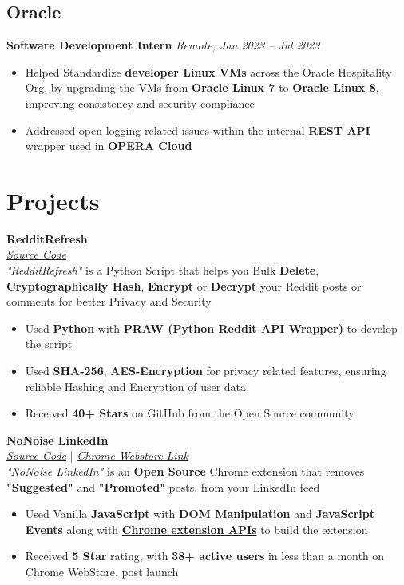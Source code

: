 \documentclass[a4paper,8pt]{article}
\newcommand{\praw}{\href{https://github.com/praw-dev/praw}{PRAW (Python Reddit API Wrapper)}}
\begin{document}
\subsection*{Oracle }
\textbf{Software Development Intern} \hfill \textit{Remote, Jan 2023 -- Jul 2023}
\begin{itemize}[leftmargin=1.5em]
  \item Helped Standardize \textbf{developer Linux VMs} across the Oracle Hospitality Org, by upgrading the VMs from \textbf{Oracle Linux 7} to \textbf{Oracle Linux 8}, improving consistency and security compliance 
  \item Addressed open logging-related issues within the internal \textbf{REST API} wrapper used in \textbf{OPERA Cloud}
\end{itemize}

\section*{\faRocket\hspace{0.5em}Projects}

\textbf{RedditRefresh} \\ \textit{\href{https://github.com/karan51ngh/RedditRefresh}{Source Code}} \\
\textit{"RedditRefresh"} is a Python Script that helps you Bulk \textbf{Delete}, \textbf{Cryptographically Hash}, \textbf{Encrypt} or \textbf{Decrypt} your Reddit posts or comments for better Privacy and Security
\begin{itemize}[leftmargin=1.5em]
    \item Used \textbf{Python} with \textbf{\praw} to develop the script
    \item Used \textbf{SHA-256}, \textbf{AES-Encryption} for privacy related features, ensuring reliable Hashing and Encryption of user data
    \item Received \textbf{40+ Stars} on GitHub from the Open Source community
\end{itemize}
\textbf{NoNoise LinkedIn} \\ \textit{\href{https://github.com/karan51ngh/no-noise-linkedin}{Source Code}} | \textit{\href{https://github.com/karan51ngh/no-noise-linkedin}{Chrome Webstore Link}} \\
\textit{"NoNoise LinkedIn"} is an \textbf{Open Source} Chrome extension that removes \textbf{"Suggested"} and \textbf{"Promoted"} posts, from your LinkedIn feed

\begin{itemize}[leftmargin=1.5em]
    \item Used Vanilla \textbf{JavaScript} with \textbf{DOM Manipulation} and \textbf{JavaScript Events} along with \textbf{\href{https://developer.chrome.com/docs/extensions/reference/api}{Chrome extension APIs}} to build the extension
    \item Received \textbf{5 Star} rating, with \textbf{38+ active users} in less than a month on Chrome WebStore, post launch
\end{itemize}
\end{document}
